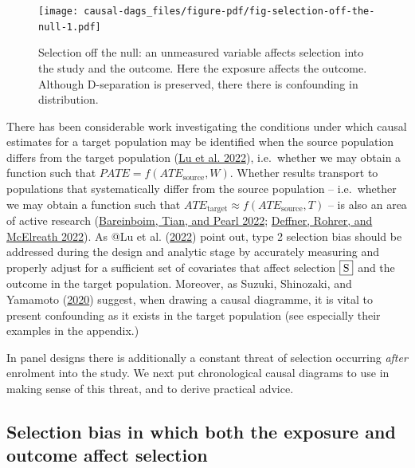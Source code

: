 \documentclass[
  singlecolumn]{report}
\begin{document}
\begin{figure}

{\centering \texttt{[image: causal-dags\_files/figure-pdf/fig-selection-off-the-null-1.pdf]}

}

\caption{\label{fig-selection-off-the-null}Selection off the null: an
unmeasured variable affects selection into the study and the outcome.
Here the exposure affects the outcome. Although D-separation is
preserved, there there is confounding in distribution.}

\end{figure}

There has been considerable work investigating the conditions under
which causal estimates for a target population may be identified when
the source population differs from the target population
(\protect\hyperlink{ref-lu2022a}{Lu et al. 2022}), i.e.~whether we may
obtain a function such that \(PATE = f(ATE_{\text{source}}, W)\).
Whether results transport to populations that systematically differ from
the source population -- i.e.~whether we may obtain a function such that
\(ATE_{\text{target}} \approx f(ATE_{\text{source}}, T)\) -- is also an
area of active research
(\protect\hyperlink{ref-bareinboim2022a}{Bareinboim, Tian, and Pearl
2022}; \protect\hyperlink{ref-deffner2022a}{Deffner, Rohrer, and
McElreath 2022}). As @Lu et al. (\protect\hyperlink{ref-lu2022a}{2022})
point out, type 2 selection bias should be addressed during the design
and analytic stage by accurately measuring and properly adjust for a
sufficient set of covariates that affect selection \(\framebox{S}\) and
the outcome in the target population. Moreover, as Suzuki, Shinozaki,
and Yamamoto (\protect\hyperlink{ref-suzuki2020}{2020}) suggest, when
drawing a causal diagramme, it is vital to present confounding as it
exists in the target population (see especially their examples in the
appendix.)

In panel designs there is additionally a constant threat of selection
occurring \emph{after} enrolment into the study. We next put
chronological causal diagrams to use in making sense of this threat, and
to derive practical advice.

\hypertarget{selection-bias-in-which-both-the-exposure-and-outcome-affect-selection}{%
\subsection{Selection bias in which both the exposure and outcome affect
selection}\label{selection-bias-in-which-both-the-exposure-and-outcome-affect-selection}}
\end{document}
